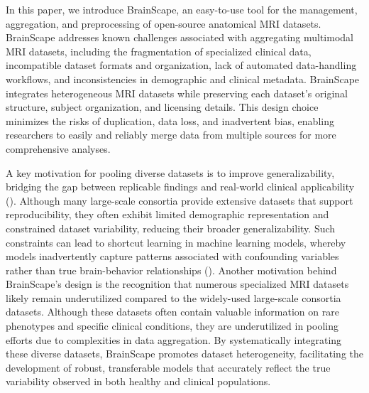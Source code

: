 In this paper, we introduce BrainScape, an easy-to-use tool for the management, aggregation, 
and preprocessing of open-source anatomical MRI datasets.
BrainScape addresses known challenges associated with aggregating multimodal MRI datasets, 
including the fragmentation of specialized clinical data, incompatible dataset formats and organization, 
lack of automated data-handling workflows, and inconsistencies in demographic and clinical metadata.
BrainScape integrates heterogeneous MRI datasets while preserving each dataset's original structure, subject organization, and licensing details.
This design choice minimizes the risks of duplication, data loss, and inadvertent bias, enabling researchers to easily and reliably merge data from multiple sources 
for more comprehensive analyses.

A key motivation for pooling diverse datasets is to improve generalizability, 
bridging the gap between replicable findings and real-world clinical applicability 
(\cite{marek2024replicability, adkinson2024brain, yang2024limits}).
Although many large-scale consortia provide extensive datasets that support reproducibility, 
they often exhibit limited demographic representation and constrained dataset variability, 
reducing their broader generalizability. 
Such constraints can lead to shortcut learning in machine learning models, 
whereby models inadvertently capture patterns associated with confounding variables 
rather than true brain-behavior relationships (\cite{marek2024replicability, yang2024limits}). 
Another motivation behind BrainScape's design is the recognition that 
numerous specialized MRI datasets likely remain underutilized 
compared to the widely-used large-scale consortia datasets. 
Although these datasets often contain valuable information on rare phenotypes and specific clinical conditions, 
they are underutilized in pooling efforts due to complexities in data aggregation. 
By systematically integrating these diverse datasets, BrainScape promotes 
dataset heterogeneity, facilitating the development of robust, transferable models 
that accurately reflect the true variability observed in both healthy and clinical populations.

